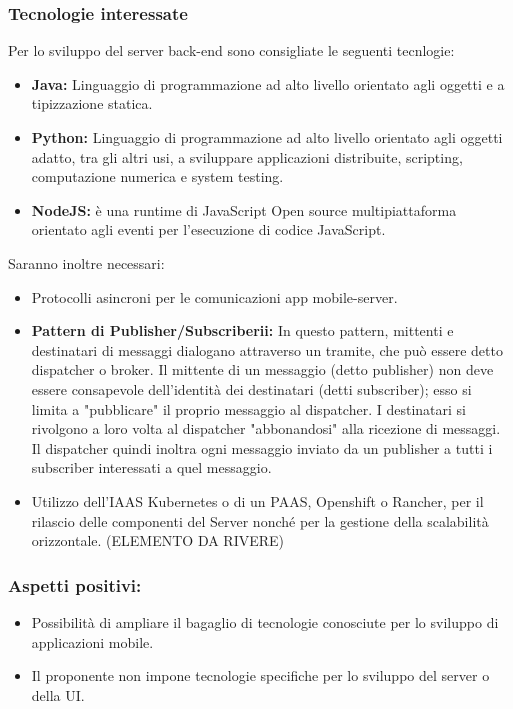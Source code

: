 	\subsubsection{Tecnologie interessate}
		Per lo sviluppo del server back-end sono consigliate le seguenti tecnlogie: 
		\begin{itemize}
			\item \textbf{Java:} Linguaggio di programmazione ad alto livello orientato agli oggetti e a tipizzazione statica.
			\item \textbf{Python:} Linguaggio di programmazione ad alto livello orientato agli oggetti adatto, tra gli altri usi, a sviluppare applicazioni distribuite, scripting, computazione numerica e system testing.
			\item \textbf{NodeJS:} è una runtime di JavaScript Open source multipiattaforma orientato agli eventi per l'esecuzione di codice JavaScript.
		\end{itemize}
		Saranno inoltre necessari: 
		\begin{itemize}
			\item Protocolli asincroni per le comunicazioni app mobile-server.
			\item \textbf{Pattern di Publisher/Subscriberii:} In questo pattern, mittenti e destinatari di messaggi dialogano attraverso un tramite, che può essere detto dispatcher o broker. Il mittente di un messaggio (detto publisher) non deve essere consapevole dell'identità dei destinatari (detti subscriber); esso si limita a "pubblicare" il proprio messaggio al dispatcher. I destinatari si rivolgono a loro volta al dispatcher "abbonandosi" alla ricezione di messaggi. Il dispatcher quindi inoltra ogni messaggio inviato da un publisher a tutti i subscriber interessati a quel messaggio.
			\item Utilizzo dell’IAAS Kubernetes o di un PAAS, Openshift o Rancher, per il rilascio delle componenti del Server nonché per la gestione della scalabilità orizzontale. 
			(ELEMENTO DA RIVERE)
		\end{itemize}
	
	\subsubsection{Aspetti positivi:}
		\begin{itemize}
			\item Possibilità di ampliare il bagaglio di tecnologie conosciute per lo sviluppo di applicazioni mobile.
			\item Il proponente non impone tecnologie specifiche per lo sviluppo del server o
			della UI.
		\end{itemize}
	
